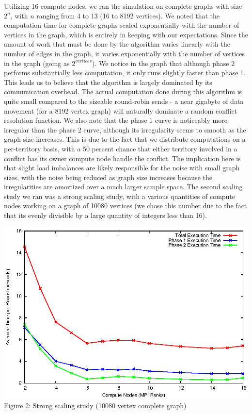 \documentclass[10pt]{article}
\begin{document}
\begin{multicols}{2}
		Utilizing 16 compute nodes, we ran the simulation on complete graphs with size $2^{n}$, with $n$ ranging from 4 to 13 (16 to 8192 vertices). 
		We noted that the computation time for complete graphs scaled exponentially with the number of vertices in the graph, which is entirely in keeping with our expectations. 
		Since the amount of work that must be done by the algorithm varies linearly with the number of edges in the graph, it varies exponentially with the number of vertices in the graph (going as $2^{vertices}$). 
		We notice in the graph that although phase 2 performs substantially less computation, it only runs slightly faster than phase 1. 
		This leads us to believe that the algorithm is largely dominated by its communication overhead. 
		The actual computation done during this algorithm is quite small compared to the sizeable round-robin sends - a near gigabyte of data movement (for a 8192 vertex graph) will naturally dominate a random conflict resolution function.
		We also note that the phase 1 curve is noticeably more irregular than the phase 2 curve, although its irregularity seems to smooth as the graph size increases. 
		This is due to the fact that we distribute computations on a per-territory basis, with a 50 percent chance that either territory involved in a conflict has its owner compute node handle the conflict. 
		The implication here is that slight load imbalances are likely responsible for the noise with small graph sizes, with the noise being reduced as graph size increases because the irregularities are amortized over a much larger sample space.
		The second scaling study we ran was a strong scaling study, with a various quantities of compute nodes working on a graph of 10080 vertices (we chose this number due to the fact that its evenly divisible by a large quantity of integers less than 16). 
		\begin{center}
			\includegraphics[width=.45\textwidth]{results/graphs/ranks.eps}
			\small{Figure 2: Strong scaling study (10080 vertex complete graph)}
		\end{center}
		

\end{multicols}
\end{document}

